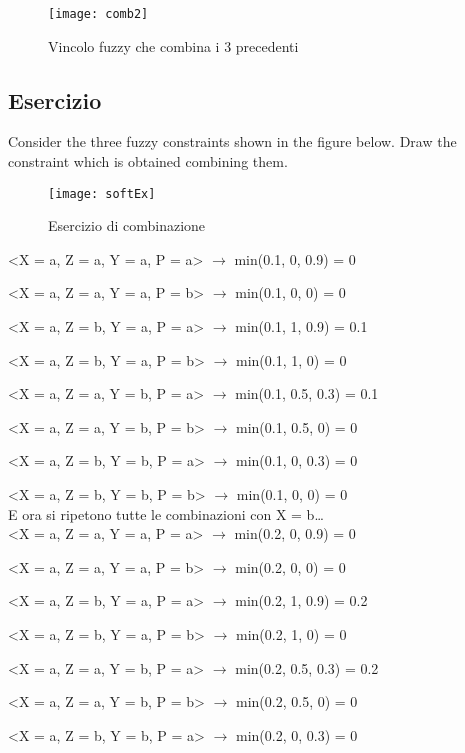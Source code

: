 \begin{figure}[H]
\centering
\texttt{[image: comb2]}
\caption{Vincolo fuzzy che combina i 3 precedenti}
\label{fig:comb2}
\end{figure}

\subsection{Esercizio}

Consider the three fuzzy constraints shown in the figure below.
Draw the constraint which is obtained combining them.

\begin{figure}[H]
\centering
\texttt{[image: softEx]}
\caption{Esercizio di combinazione}
\label{fig:comb2}
\end{figure}

<X = a, Z = a, Y = a, P = a> $\rightarrow$ min(0.1, 0, 0.9) = 0

<X = a, Z = a, Y = a, P = b> $\rightarrow$ min(0.1, 0, 0) = 0

<X = a, Z = b, Y = a, P = a> $\rightarrow$ min(0.1, 1, 0.9) = 0.1

<X = a, Z = b, Y = a, P = b> $\rightarrow$ min(0.1, 1, 0) = 0

<X = a, Z = a, Y = b, P = a> $\rightarrow$ min(0.1, 0.5, 0.3) = 0.1

<X = a, Z = a, Y = b, P = b> $\rightarrow$ min(0.1, 0.5, 0) = 0

<X = a, Z = b, Y = b, P = a> $\rightarrow$ min(0.1, 0, 0.3) = 0

<X = a, Z = b, Y = b, P = b> $\rightarrow$ min(0.1, 0, 0) = 0\\

E ora si ripetono tutte le combinazioni con X = b\dots\\

<X = a, Z = a, Y = a, P = a> $\rightarrow$ min(0.2, 0, 0.9) = 0

<X = a, Z = a, Y = a, P = b> $\rightarrow$ min(0.2, 0, 0) = 0

<X = a, Z = b, Y = a, P = a> $\rightarrow$ min(0.2, 1, 0.9) = 0.2

<X = a, Z = b, Y = a, P = b> $\rightarrow$ min(0.2, 1, 0) = 0

<X = a, Z = a, Y = b, P = a> $\rightarrow$ min(0.2, 0.5, 0.3) = 0.2

<X = a, Z = a, Y = b, P = b> $\rightarrow$ min(0.2, 0.5, 0) = 0

<X = a, Z = b, Y = b, P = a> $\rightarrow$ min(0.2, 0, 0.3) = 0

